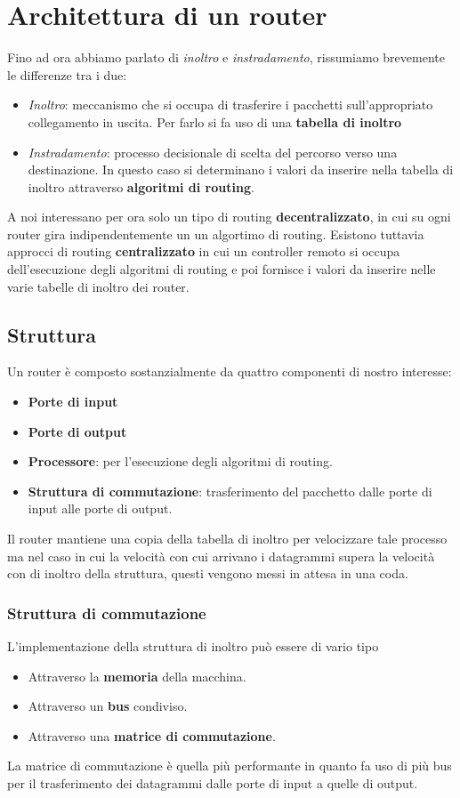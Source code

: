 \section{Architettura di un router}
Fino ad ora abbiamo parlato di \emph{inoltro} e \emph{instradamento},
rissumiamo brevemente le differenze tra i due:
\begin{itemize}
	\item \emph{Inoltro}: meccanismo che si occupa di trasferire i
		pacchetti sull'appropriato collegamento in uscita. Per farlo
		si fa uso di una \textbf{tabella di inoltro}
	\item \emph{Instradamento}: processo decisionale di scelta del
		percorso verso una destinazione. In questo caso si determinano
		i valori da inserire nella tabella di inoltro attraverso 
		\textbf{algoritmi di routing}.
\end{itemize}
A noi interessano per ora solo un tipo di routing 
\textbf{decentralizzato}, in cui su ogni router gira indipendentemente
un un algortimo di routing. Esistono tuttavia approcci di routing
\textbf{centralizzato} in cui un controller remoto si occupa
dell'esecuzione degli algoritmi di routing e poi fornisce i valori da
inserire nelle varie tabelle di inoltro dei router.

\subsection{Struttura}
Un router è composto sostanzialmente da quattro componenti di nostro
interesse:
\begin{itemize}
	\item \textbf{Porte di input}
	\item \textbf{Porte di output}
	\item \textbf{Processore}: per l'esecuzione degli algoritmi di
		routing.
	\item \textbf{Struttura di commutazione}: trasferimento del 
		pacchetto dalle porte di input alle porte di output.
\end{itemize}
Il router mantiene una copia della tabella di inoltro per velocizzare
tale processo ma nel caso in cui la velocità con cui arrivano i 
datagrammi supera la velocità con di inoltro della struttura, questi
vengono messi in attesa in una coda.

\subsubsection{Struttura di commutazione}
L'implementazione della struttura di inoltro può essere di vario tipo
\begin{itemize}
	\item Attraverso la \textbf{memoria} della macchina.
	\item Attraverso un \textbf{bus} condiviso.
	\item Attraverso una \textbf{matrice di commutazione}.
\end{itemize}
La matrice di commutazione è quella più performante in quanto fa uso
di più bus per il trasferimento dei datagrammi dalle porte di input a
quelle di output.


